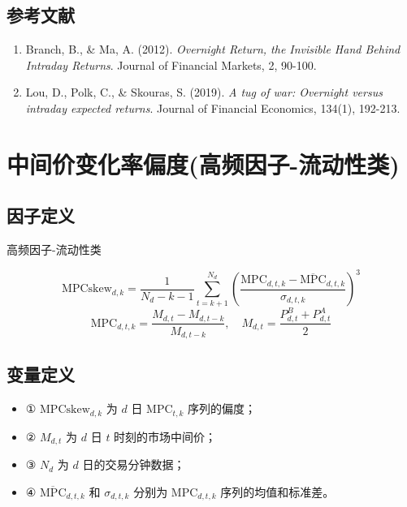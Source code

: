 \documentclass{article}
\begin{document}
\subsection{参考文献}
\begin{enumerate}
    \item Branch, B., \& Ma, A. (2012). \textit{Overnight Return, the Invisible Hand Behind Intraday Returns}. Journal of Financial Markets, 2, 90-100.
    \item Lou, D., Polk, C., \& Skouras, S. (2019). \textit{A tug of war: Overnight versus intraday expected returns}. Journal of Financial Economics, 134(1), 192-213.
\end{enumerate}

\section{中间价变化率偏度(高频因子-流动性类)}

\subsection{因子定义}
高频因子-流动性类

\begin{equation}
    \mathrm{MPCskew}_{d,k} = \frac{1}{N_d - k - 1} \sum_{t=k+1}^{N_d} \left( \frac{\mathrm{MPC}_{d,t,k} - \overline{\mathrm{MPC}}_{d,t,k}}{\sigma_{d,t,k}} \right)^3
\end{equation}
\begin{equation}
    \mathrm{MPC}_{d,t,k} = \frac{M_{d,t} - M_{d,t-k}}{M_{d,t-k}}, \quad M_{d,t} = \frac{P_{d,t}^B + P_{d,t}^A}{2}
\end{equation}

\subsection{变量定义}
\begin{itemize}
    \item ① \( \mathrm{MPCskew}_{d,k} \) 为 \( d \) 日 \( \mathrm{MPC}_{t,k} \) 序列的偏度；
    \item ② \( M_{d,t} \) 为 \( d \) 日 \( t \) 时刻的市场中间价；
    \item ③ \( N_d \) 为 \( d \) 日的交易分钟数据；
    \item ④ \( \overline{\mathrm{MPC}}_{d,t,k} \) 和 \( \sigma_{d,t,k} \) 分别为 \( \mathrm{MPC}_{d,t,k} \) 序列的均值和标准差。
\end{itemize}
\end{document}
